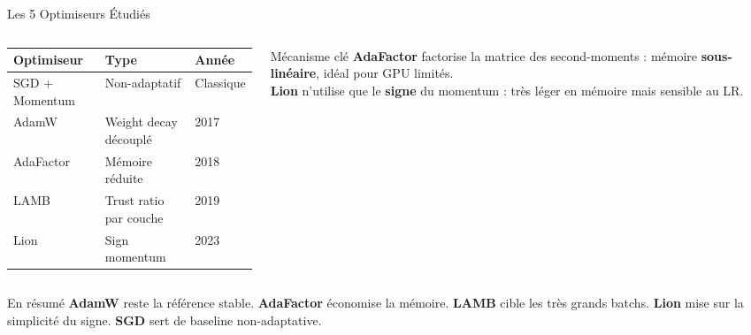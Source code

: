 \documentclass[10pt, aspectratio=169]{beamer}
\begin{document}
\begin{frame}{Les 5 Optimiseurs Étudiés}
    \vspace{0.1cm}
    \begin{columns}[t]
        \begin{column}{0.55\textwidth}
            \footnotesize
            \begin{tabular}{lll}
                \toprule
                \textbf{\color{StartupBlue}Optimiseur} & \textbf{\color{StartupBlue}Type} & \textbf{\color{StartupBlue}Année} \\
                \midrule
                SGD + Momentum & Non-adaptatif & Classique \\
                AdamW & Weight decay découplé & 2017 \\
                AdaFactor & Mémoire réduite & 2018 \\
                LAMB & Trust ratio par couche & 2019 \\
                Lion & Sign momentum & 2023 \\
                \bottomrule
            \end{tabular}
        \end{column}
        \begin{column}{0.43\textwidth}
            \begin{alertblock}{\faLightbulb\quad Mécanisme clé}
                \scriptsize
                \textbf{AdaFactor} factorise la matrice des second-moments : mémoire \textbf{sous-linéaire}, idéal pour GPU limités.
                \\[4pt]
                \textbf{Lion} n'utilise que le \textbf{signe} du momentum : très léger en mémoire mais sensible au LR.
            \end{alertblock}
        \end{column}
    \end{columns}
    \vspace{0.3cm}
    \begin{block}{\faInfoCircle\quad En résumé}
        \scriptsize
        \textbf{AdamW} reste la référence stable. \textbf{AdaFactor} économise la mémoire. \textbf{LAMB} cible les très grands batchs. \textbf{Lion} mise sur la simplicité du signe. \textbf{SGD} sert de baseline non-adaptative.
    \end{block}
\end{frame}
\end{document}
